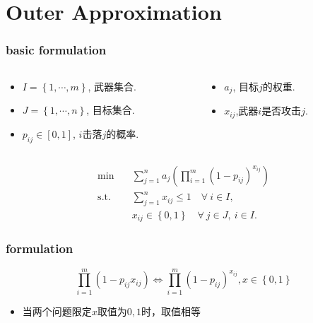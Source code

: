 \documentclass[CJK,10pt]{beamer}
\begin{document}
\section{Outer Approximation}
\begin{frame}
    \frametitle{basic formulation}
    \begin{columns}
        \begin{column}{.70\linewidth}
            \footnotesize
            \begin{itemize}
                \item $I = \left\{1,\cdots,m\right\} $, 武器集合.
                \item $J = \left\{1,\cdots,n\right\} $, 目标集合.
                \item $p_{ij}\in [0,1]$, $i$击落$j$的概率.
            \end{itemize}
        \end{column}
    \hspace{-1cm}
        \begin{column}{.35\linewidth}
            \footnotesize
            \begin{itemize}
                \item $a_j$, 目标$j$的权重.
                \item $x_{ij}$,武器$i$是否攻击$j$.
            \end{itemize}
        \end{column}
    \end{columns}
    
    \begin{align*} \tag{S0}
        \min\quad & \sum_{j=1}^n a_j \left( \prod_{i=1}^m (1 -  p_{ij})^{x_{ij}} \right) \\ 
        \mathrm{s. t.}\quad &\sum_{j=1}^n x_{ij} \leq 1\quad \forall ~i \in I,\\
        & x_{ij} \in \left\{ 0,1 \right\} \quad \forall~ j\in J , ~ i \in I.
    \end{align*}
\end{frame}

\begin{frame}
    \frametitle{formulation}
    \begin{equation*}
        \prod_{i=1}^{m}{(1-p_{ij}x_{ij})} \iff \prod_{i=1}^{m}{(1-p_{ij})^{x_{ij}}}, x \in \left\{ 0,1 \right\}
    \end{equation*}
    \begin{itemize}
        \item 当两个问题限定$x$取值为$0,1$时，取值相等
    \end{itemize}
\end{frame}
\end{document}
